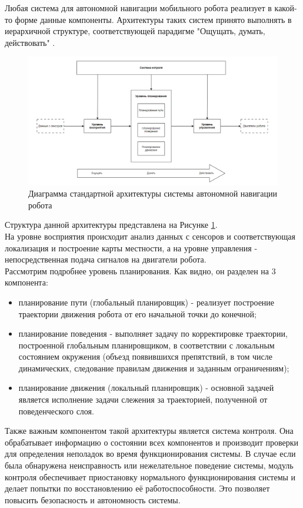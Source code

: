 Любая система для автономной навигации мобильного робота реализует в какой-то форме данные компоненты. Архитектуры таких систем принято выполнять в иерархичной структуре, соответствующей парадигме "Ощущать, думать, действовать" 
 \cite{murphy2019introduction}.

\begin{figure}[h]
    \centering
    \includegraphics[width=1.0\textwidth]{images/chap_1/sense_think_act.png}
    \caption{Диаграмма стандартной архитектуры системы автономной навигации робота}
    \label{fig:sense_think_act}
\end{figure}

Структура данной архитектуры представлена на Рисунке \ref*{fig:sense_think_act}. \\
На уровне восприятия происходит анализ данных с сенсоров и соответствующая локализация и построение карты местности, а на уровне управления - непосредственная подача сигналов на двигатели робота. \\
Рассмотрим подробнее уровень планирования. Как видно, он разделен на 3 компонента:
\begin{itemize}
    \item планирование пути (глобальный планировщик) - реализует построение траектории движения робота от его начальной точки до конечной;
    \item планирование поведения - выполняет задачу по корректировке траектории, построенной глобальным планировщиком, в соответствии с локальным состоянием окружения (объезд появившихся препятствий, в том числе динамических, следование правилам движения и заданным ограничениям);
    \item планирование движения (локальный планировщик) - основной задачей является исполнение задачи слежения за траекторией, полученной от поведенческого слоя.
\end{itemize}
Также важным компонентом такой архитектуры является система контроля. Она обрабатывает информацию о состоянии всех компонентов и производит проверки для определения неполадок во время функционирования системы. В случае если была обнаружена неисправность или нежелательное поведение системы, модуль контроля обеспечивает приостановку нормального функционирования системы и делает попытки по восстановлению её работоспособности. Это позволяет повысить безопасность и автономность системы.

